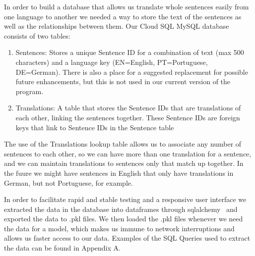 \documentclass[runningheads]{llncs}
\begin{document}
	In order to build a database that allows us translate whole sentences easily from one language to another we needed a way to store the text of the sentences as well as the relationships between them. Our Cloud SQL MySQL database consists of two tables:
			
		\begin{enumerate}
			\item Sentences: Stores a unique Sentence ID for a combination of text (max 500 characters) and a language key (EN=English, PT=Portuguese, DE=German). There is also a place for a suggested replacement for possible future enhancements, but this is not used in our current version of the program.
			\item Translations: A table that stores the Sentence IDs that are translations of each other, linking the sentences together. These Sentence IDs are foreign keys that link to Sentence IDs in the Sentence table
		\end{enumerate}

	The use of the Translations lookup table allows us to associate any number of sentences to each other, so we can have more than one translation for a sentence, and we can maintain translations to sentences only that match up together. In the fuure we might have sentences in English that only have translations in German, but not Portuguese, for example. 	

	\begin{minipage}{\linewidth}
			\hspace*{-.25in}
  			 \noindent{}
			\label{fig:Database Diagrams}
			\vspace*{1cm}
	\end{minipage}
	\afterpage{\clearpage}

	In order to facilitate rapid and stable testing and a responsive user interface we extracted the data in the database into dataframes through sqlalchemy~\cite{ref_url15} and exported the data to .pkl files. We then loaded the .pkl files whenever we need the data for a model, which makes us immune to network interruptions and allows us faster access to our data. Examples of the SQL Queries used to extract the data can be found in Appendix A.
	
\end{document}
